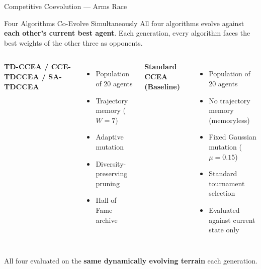 \documentclass[aspectratio=169, 11pt]{beamer}
\begin{document}
\begin{frame}{Competitive Coevolution --- Arms Race}
\begin{block}{Four Algorithms Co-Evolve Simultaneously}
All four algorithms evolve against \textbf{each other's current best agent}. Each generation, every algorithm faces the best weights of the other three as opponents.
\end{block}
\vspace{0.15cm}\small
\begin{columns}[t]
    \textbf{TD-CCEA / CCE-TDCCEA / SA-TDCCEA}
    \begin{itemize}
        \item Population of 20 agents
        \item Trajectory memory ($W=7$)
        \item Adaptive mutation
        \item Diversity-preserving pruning
        \item Hall-of-Fame archive
    \end{itemize}
    \textbf{Standard CCEA (Baseline)}
    \begin{itemize}
        \item Population of 20 agents
        \item No trajectory memory (memoryless)
        \item Fixed Gaussian mutation ($\mu=0.15$)
        \item Standard tournament selection
        \item Evaluated against current state only
    \end{itemize}
\end{columns}
\vspace{0.2cm}\centering
All four evaluated on the \textbf{same dynamically evolving terrain} each generation.
\end{frame}
\end{document}
